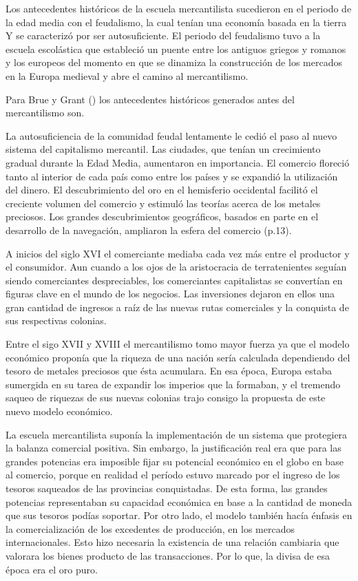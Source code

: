 \documentclass[
  stu,
  floatsintext,
  longtable,
  a4paper,
  nolmodern,
  notxfonts,
  notimes,
  12pt,
  colorlinks=true,linkcolor=blue,citecolor=blue,urlcolor=blue]{apa7}
\begin{document}
Los antecedentes históricos de la escuela mercantilista sucedieron en el
periodo de la edad media con el feudalismo, la cual tenían una economía
basada en la tierra Y se caracterizó por ser autosuficiente. El periodo
del feudalismo tuvo a la escuela escolástica que estableció un puente
entre los antiguos griegos y romanos y los europeos del momento en que
se dinamiza la construcción de los mercados en la Europa medieval y abre
el camino al mercantilismo.

Para Brue y Grant
() los
antecedentes históricos generados antes del mercantilismo son.

La autosuficiencia de la comunidad feudal lentamente le cedió el paso al
nuevo sistema del capitalismo mercantil. Las ciudades, que tenían un
crecimiento gradual durante la Edad Media, aumentaron en importancia. El
comercio floreció tanto al interior de cada país como entre los países y
se expandió la utilización del dinero. El descubrimiento del oro en el
hemisferio occidental facilitó el creciente volumen del comercio y
estimuló las teorías acerca de los metales preciosos. Los grandes
descubrimientos geográficos, basados en parte en el desarrollo de la
navegación, ampliaron la esfera del comercio (p.13).

A inicios del siglo XVI el comerciante mediaba cada vez más entre el
productor y el consumidor. Aun cuando a los ojos de la aristocracia de
terratenientes seguían siendo comerciantes despreciables, los
comerciantes capitalistas se convertían en figuras clave en el mundo de
los negocios. Las inversiones dejaron en ellos una gran cantidad de
ingresos a raíz de las nuevas rutas comerciales y la conquista de sus
respectivas colonias.

Entre el sigo XVII y XVIII el mercantilismo tomo mayor fuerza ya que el
modelo económico proponía que la riqueza de una nación sería calculada
dependiendo del tesoro de metales preciosos que ésta acumulara. En esa
época, Europa estaba sumergida en su tarea de expandir los imperios que
la formaban, y el tremendo saqueo de riquezas de sus nuevas colonias
trajo consigo la propuesta de este nuevo modelo económico.

La escuela mercantilista suponía la implementación de un sistema que
protegiera la balanza comercial positiva. Sin embargo, la justificación
real era que para las grandes potencias era imposible fijar su potencial
económico en el globo en base al comercio, porque en realidad el período
estuvo marcado por el ingreso de los tesoros saqueados de las provincias
conquistadas. De esta forma, las grandes potencias representaban su
capacidad económica en base a la cantidad de moneda que sus tesoros
podías soportar. Por otro lado, el modelo también hacía énfasis en la
comercialización de los excedentes de producción, en los mercados
internacionales. Esto hizo necesaria la existencia de una relación
cambiaria que valorara los bienes producto de las transacciones. Por lo
que, la divisa de esa época era el oro puro.
\end{document}
